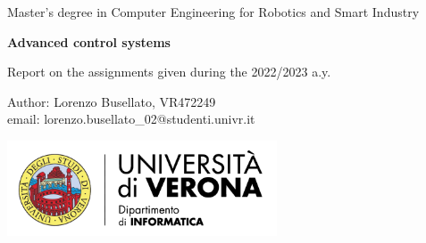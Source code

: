 \documentclass{article}
\numberwithin{equation}{section}
\newcommand\blankpage{%
    \null
    \thispagestyle{empty}%
    \addtocounter{page}{-1}%
    \newpage}
\begin{document}
\afterpage{\blankpage}
\begin{titlepage}
\begin{center}
\huge Master's degree in Computer Engineering for Robotics and Smart Industry
\end{center}
\vspace*{\fill}
\begin{center}
\textbf{\Huge Advanced control systems}
\end{center}
\begin{center}
Report on the assignments given during the 2022/2023 a.y.
\end{center}
\vspace*{\fill}
\begin{center}
\begin{minipage}{0.4\textwidth}
\begin{flushleft}
Author: Lorenzo Busellato, VR472249\\
email: lorenzo.busellato\_02@studenti.univr.it
\end{flushleft}
\end{minipage}
\begin{minipage}{0.5\textwidth}
\begin{flushright}
\includegraphics[keepaspectratio,width=0.6\textwidth]{logo}
\end{flushright}
\end{minipage}

\end{center}
\vspace{1cm}
\end{titlepage}


\afterpage{\blankpage}
\thispagestyle{empty}
\setcounter{page}{0}
\renewcommand{\cftsecleader}{\cftdotfill{\cftdotsep}}
\setcounter{tocdepth}{2}
\tableofcontents
\clearpage

\fancyhead[R]{}
\fancyhead[L]{}
\pagestyle{fancy}



\newpage



\newpage


\end{document}
